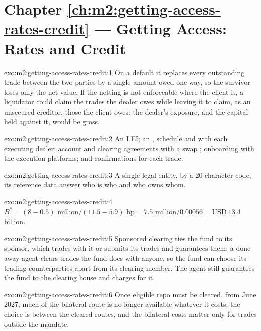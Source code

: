 \section*{Chapter \ref{ch:m2:getting-access-rates-credit} --- Getting Access: Rates and Credit}

\begin{solution}{exo:m2:getting-access-rates-credit:1}
On a default it replaces every outstanding trade between the two parties by a single
amount owed one way, so the survivor loses only the net value. If the netting is not
enforceable where the client is, a liquidator could claim the trades the dealer owes
while leaving it to claim, as an unsecured creditor, those the client owes: the
dealer's exposure, and the capital held against it, would be gross.
\end{solution}

\begin{solution}{exo:m2:getting-access-rates-credit:2}
An LEI; an , schedule and  with each executing
dealer; account and clearing agreements with a swap ; onboarding with the
execution platforms; and confirmations for each trade.
\end{solution}

\begin{solution}{exo:m2:getting-access-rates-credit:3}
A single legal entity, by a 20-character code; its reference data answer who is who and
who owns whom.
\end{solution}

\begin{solution}{exo:m2:getting-access-rates-credit:4}
$B^* = (8 - 0.5)\text{ million} / (11.5 - 5.9)\text{ bp} = 7.5\text{ million} / 0.00056 =
\text{USD}~13.4$ billion.
\end{solution}

\begin{solution}{exo:m2:getting-access-rates-credit:5}
Sponsored clearing ties the fund to its sponsor, which trades with it or submits its
trades and guarantees them; a done-away agent clears trades the fund does with anyone,
so the fund can choose its trading counterparties apart from its clearing member. The
agent still guarantees the fund to the clearing house and charges for it.
\end{solution}

\begin{solution}{exo:m2:getting-access-rates-credit:6}
Once eligible repo must be cleared, from June 2027, much of the bilateral route is no
longer available whatever it costs; the choice is between the cleared routes, and the
bilateral costs matter only for trades outside the mandate.
\end{solution}

